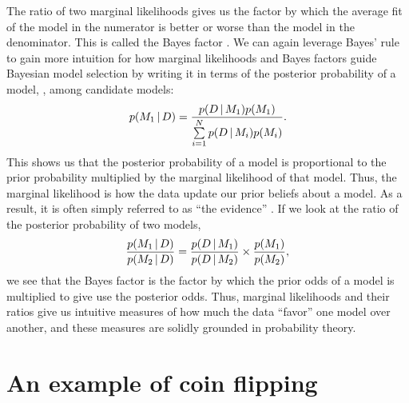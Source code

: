 \begin{linenomath}
The ratio of two marginal likelihoods gives us the factor by which the
average fit of the model in the numerator is better or worse than the
model in the denominator.
This is called the Bayes factor \citep{Jeffreys1935}.
We can again leverage Bayes' rule to gain more intuition for how marginal
likelihoods and Bayes factors guide Bayesian model selection by
writing it in terms of the posterior probability of a model, \model[1],
among \nmodels candidate models:
\begin{equation}
    p(\model[1] \given \data) = \frac{
        p(\data \given \model[1])
        p(\model[1])
    }{
        \sum\limits_{i=1}^{\nmodels}
        p(\data \given \model[i])
        p(\model[i])
    }.
    \label{eq:bayesRuleModelProbability}
\end{equation}
This shows us that the posterior probability of a model is proportional to the
prior probability multiplied by the marginal likelihood of that model.
Thus, the marginal likelihood is how the data update our prior beliefs about a
model.
As a result, it is often simply referred to as ``the evidence''
\citep{MacKay2005}.
If we look at the ratio of the posterior probability of two models,
\begin{equation}
    \frac{
        p(\model[1] \given \data)
    }{
        p(\model[2] \given \data)
    }
    =
    \frac{
        p(\data \given \model[1])
    }{
        p(\data \given \model[2])
    }
    \times
    \frac{
        p(\model[1])
    }{
        p(\model[2])
    },
    \label{eq:modelOdds}
\end{equation}
we see that the Bayes factor is the factor by which the prior odds of a model
is multiplied to give use the posterior odds.
Thus, marginal likelihoods and their ratios give us intuitive measures of how
much the data ``favor'' one model over another, and these measures are solidly
grounded in probability theory.
\end{linenomath}

\section{An example of coin flipping}

